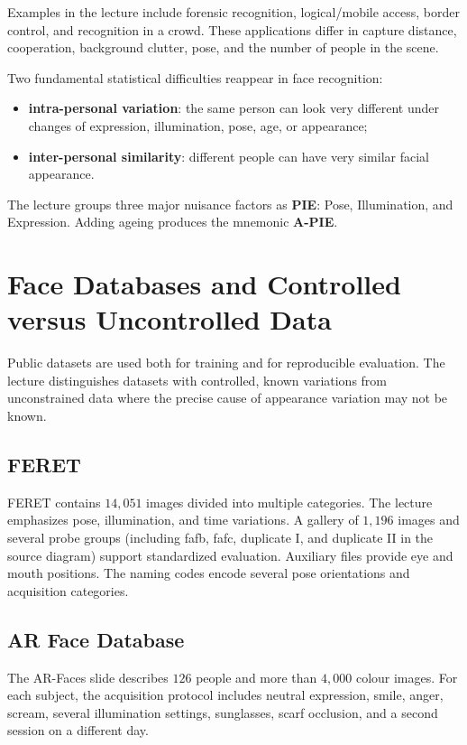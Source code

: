 \documentclass[11pt,a4paper,oneside]{report}
\begin{document}
Examples in the lecture include forensic recognition, logical/mobile access,
border control, and recognition in a crowd.  These applications differ in
capture distance, cooperation, background clutter, pose, and the number of
people in the scene.

Two fundamental statistical difficulties reappear in face recognition:
\begin{itemize}
    \item \textbf{intra-personal variation}: the same person can look very
          different under changes of expression, illumination, pose, age, or
          appearance;
    \item \textbf{inter-personal similarity}: different people can have very
          similar facial appearance.
\end{itemize}

The lecture groups three major nuisance factors as \textbf{PIE}: Pose,
Illumination, and Expression.  Adding ageing produces the mnemonic
\textbf{A-PIE}.

\section{Face Databases and Controlled versus Uncontrolled Data}
\label{sec:face-databases}

Public datasets are used both for training and for reproducible evaluation.  The
lecture distinguishes datasets with controlled, known variations from
unconstrained data where the precise cause of appearance variation may not be
known.

\subsection{FERET}

FERET contains $14{,}051$ images divided into multiple categories.  The lecture
emphasizes pose, illumination, and time variations.  A gallery of $1{,}196$
images and several probe groups (including fafb, fafc, duplicate I, and
duplicate II in the source diagram) support standardized evaluation.  Auxiliary
files provide eye and mouth positions.  The naming codes encode several pose
orientations and acquisition categories.

\subsection{AR Face Database}

The AR-Faces slide describes $126$ people and more than $4{,}000$ colour images.
For each subject, the acquisition protocol includes neutral expression, smile,
anger, scream, several illumination settings, sunglasses, scarf occlusion, and a
second session on a different day.
\end{document}
